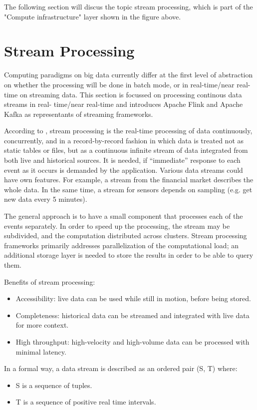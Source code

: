 The following section will discus the topic stream processing, which is part of the
"Compute infrastructure" layer shown in the figure above.

\section{Stream Processing}

Computing paradigms on big data currently differ at the first level of abstraction on
whether the processing will be done in batch mode, or in real-time/near real-time on
streaming data. This section is focussed on processing continous data streams in real-
time/near real-time and introduces Apache Flink and Apache Kafka as representants of
streaming frameworks.

According to \cite{Klepp16}, stream processing is the real-time processing of data continuously,
concurrently, and in a record-by-record fashion in which data is treated not as static tables
or files, but as a continuous infinite stream of data integrated from both live and historical
sources. It is needed, if “immediate” response to each event as it occurs is demanded by
the application. Various data streams could have own features. For example, a stream
from the financial market describes the whole data. In the same time, a stream for sensors
depends on sampling (e.g. get new data every 5 minutes).

The general approach is to have a small component that processes each of the events
separately. In order to speed up the processing, the stream may be subdivided, and the
computation distributed across clusters. Stream processing frameworks primarily addresses
parallelization of the computational load; an additional storage layer is needed to store
the results in order to be able to query them.

Benefits of stream processing:

\begin{itemize}
	\item Accessibility: live data can be used while still in motion, before being stored.
	\item Completeness: historical data can be streamed and integrated with live data for
	more context.
	\item High throughput: high-velocity and high-volume data can be processed with minimal latency.
\end{itemize}

In a formal way, a data stream is described as an ordered pair (S, T) where:
\begin{itemize}
	\item S is a sequence of tuples.
	\item T is a sequence of positive real time intervals.
\end{itemize}

